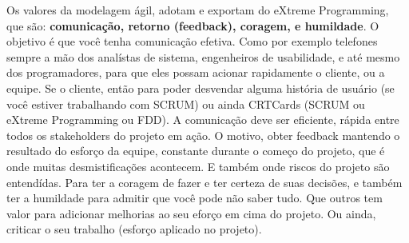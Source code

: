 \documentclass[conference]{IEEEtran}
\begin{document}
Os valores da modelagem ágil, adotam e exportam do eXtreme Programming, que são: {\bfseries comunicação, retorno (feedback), coragem, e humildade}. O objetivo é que você tenha comunicação efetiva. Como por exemplo telefones sempre a mão dos analístas de sistema, engenheiros de usabilidade, e até mesmo dos programadores, para que eles possam acionar rapidamente o cliente, ou a equipe. Se o cliente, então para poder desvendar alguma história de usuário (se você estiver trabalhando com SCRUM) ou ainda CRTCards (SCRUM ou eXtreme Programming ou FDD). A comunicação deve ser eficiente, rápida entre todos os stakeholders do projeto em ação. O motivo, obter feedback mantendo o resultado do esforço da equipe, constante durante o começo do projeto, que é onde muitas desmistificações acontecem. E também onde riscos do projeto são entendídas. Para ter a coragem de fazer e ter certeza de suas decisões, e também ter a humildade para admitir que você pode não saber tudo. Que outros tem valor para adicionar melhorias ao seu eforço em cima do projeto. Ou ainda, criticar o seu trabalho (esforço aplicado no projeto).

\vfil\eject


%

%
\end{document}

